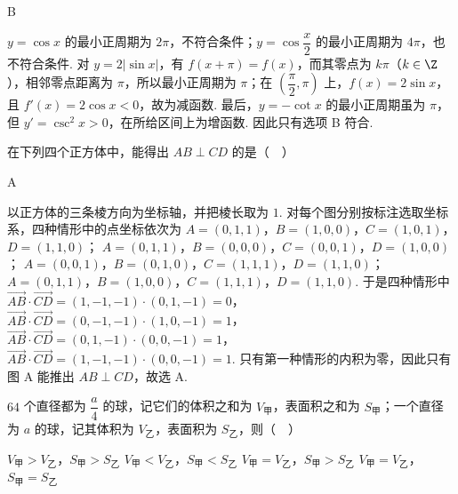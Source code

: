 \begin{answer}
B
\end{answer}

\begin{solution}
\(y=\cos x\) 的最小正周期为 \(2\pi\)，不符合条件；\(y=\cos\dfrac{x}{2}\) 的最小正周期为 \(4\pi\)，也不符合条件. 对 \(y=2\lvert\sin x\rvert\)，有 \(f(x+\pi)=f(x)\)，而其零点为 \(k\pi\)（\(k\in\Z\)），相邻零点距离为 \(\pi\)，所以最小正周期为 \(\pi\)；在 \(\left(\dfrac{\pi}{2},\pi\right)\) 上，\(f(x)=2\sin x\)，且 \(f'(x)=2\cos x<0\)，故为减函数. 最后，\(y=-\cot x\) 的最小正周期虽为 \(\pi\)，但 \(y'=\csc^2x>0\)，在所给区间上为增函数. 因此只有选项 B 符合.
\end{solution}

\begin{problem}
在下列四个正方体中，能得出 \(AB\perp CD\) 的是（\(\quad\)）

    {}
    {}
    {}
\end{problem}

\begin{answer}
A
\end{answer}

\begin{solution}
以正方体的三条棱方向为坐标轴，并把棱长取为 \(1\). 对每个图分别按标注选取坐标系，四种情形中的点坐标依次为
\(A=(0,1,1)\)，\(B=(1,0,0)\)，\(C=(1,0,1)\)，\(D=(1,1,0)\)；
\(A=(0,1,1)\)，\(B=(0,0,0)\)，\(C=(0,0,1)\)，\(D=(1,0,0)\)；
\(A=(0,0,1)\)，\(B=(0,1,0)\)，\(C=(1,1,1)\)，\(D=(1,1,0)\)；
\(A=(0,1,1)\)，\(B=(1,0,0)\)，\(C=(1,1,1)\)，\(D=(1,1,0)\).
于是四种情形中
\(\overrightarrow{AB}\cdot\overrightarrow{CD}=(1,-1,-1)\cdot(0,1,-1)=0\)，
\(\overrightarrow{AB}\cdot\overrightarrow{CD}=(0,-1,-1)\cdot(1,0,-1)=1\)，
\(\overrightarrow{AB}\cdot\overrightarrow{CD}=(0,1,-1)\cdot(0,0,-1)=1\)，
\(\overrightarrow{AB}\cdot\overrightarrow{CD}=(1,-1,-1)\cdot(0,0,-1)=1\).
只有第一种情形的内积为零，因此只有图 A 能推出 \(AB\perp CD\)，故选 A.
\end{solution}

\begin{problem}
\(64\) 个直径都为 \(\dfrac{a}{4}\) 的球，记它们的体积之和为 \(V_{\text{甲}}\)，表面积之和为 \(S_{\text{甲}}\)；一个直径为 \(a\) 的球，记其体积为 \(V_{\text{乙}}\)，表面积为 \(S_{\text{乙}}\)，则（\(\quad\)）

\choices
    {\(V_{\text{甲}}>V_{\text{乙}}\)，\(S_{\text{甲}}>S_{\text{乙}}\)}
    {\(V_{\text{甲}}<V_{\text{乙}}\)，\(S_{\text{甲}}<S_{\text{乙}}\)}
    {\(V_{\text{甲}}=V_{\text{乙}}\)，\(S_{\text{甲}}>S_{\text{乙}}\)}
    {\(V_{\text{甲}}=V_{\text{乙}}\)，\(S_{\text{甲}}=S_{\text{乙}}\)}
\end{problem}

